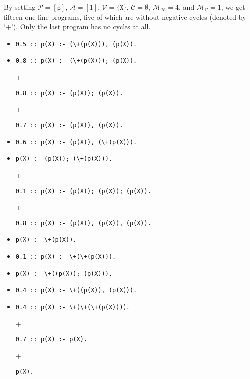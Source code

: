 \documentclass[letterpaper]{article}
\theoremstyle{definition}
\newcommand{\predicates}{\mathcal{P}}
\newcommand{\variables}{\mathcal{V}}
\newcommand{\constants}{\mathcal{C}}
\newcommand{\arities}{\mathcal{A}}
\newcommand{\maxNumNodes}{\mathcal{M}_{\mathcal{N}}}
\newcommand{\maxNumClauses}{\mathcal{M}_{\mathcal{C}}}
\begin{document}
By setting $\predicates{} = [\texttt{p}]$, $\arities{} = [1]$, $\variables{} =
\{ \texttt{X} \}$, $\constants{} = \emptyset$, $\maxNumNodes{} = 4$, and
$\maxNumClauses{} = 1$, we get fifteen one-line programs, five of which are
without negative cycles (denoted by `+'). Only the last program has no cycles at
all.

\begin{itemize}
\item
\begin{verbatim}
0.5 :: p(X) :- (\+(p(X))), (p(X)).
\end{verbatim}
\item
\begin{verbatim}
0.8 :: p(X) :- (\+(p(X))); (p(X)).
\end{verbatim}
\item[+]
\begin{verbatim}
0.8 :: p(X) :- (p(X)); (p(X)).
\end{verbatim}
\item[+]
\begin{verbatim}
0.7 :: p(X) :- (p(X)), (p(X)).
\end{verbatim}
\item
\begin{verbatim}
0.6 :: p(X) :- (p(X)), (\+(p(X))).
\end{verbatim}
\item
\begin{verbatim}
p(X) :- (p(X)); (\+(p(X))).
\end{verbatim}
\item[+]
\begin{verbatim}
0.1 :: p(X) :- (p(X)); (p(X)); (p(X)).
\end{verbatim}
\item[+]
\begin{verbatim}
0.8 :: p(X) :- (p(X)), (p(X)), (p(X)).
\end{verbatim}
\item
\begin{verbatim}
p(X) :- \+(p(X)).
\end{verbatim}
\item
\begin{verbatim}
0.1 :: p(X) :- \+(\+(p(X))).
\end{verbatim}
\item
\begin{verbatim}
p(X) :- \+((p(X)); (p(X))).
\end{verbatim}
\item
\begin{verbatim}
0.4 :: p(X) :- \+((p(X)), (p(X))).
\end{verbatim}
\item
\begin{verbatim}
0.4 :: p(X) :- \+(\+(\+(p(X)))).
\end{verbatim}
\item[+]
\begin{verbatim}
0.7 :: p(X) :- p(X).
\end{verbatim}
\item[+]
\begin{verbatim}
p(X).
\end{verbatim}
\end{itemize}
\end{document}
